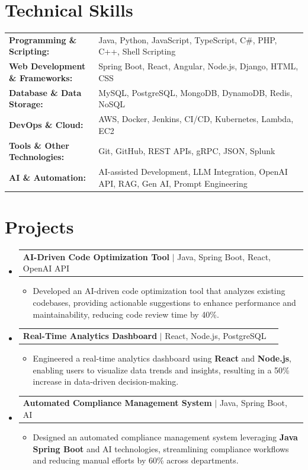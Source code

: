 \documentclass[letterpaper,10pt]{article}
\makeatletter
\newcommand{\resumeItem}[1]{
  \item{\fontsize{8pt}{9pt}\selectfont
    #1 \vspace{-3pt}
  }
}
\newcommand{\resumeProjectHeading}[2]{
    \item
    \begin{tabular*}{1.001\textwidth}{l@{\extracolsep{\fill}}r}
      \fontsize{8.5pt}{10pt}#1 & \textbf{\fontsize{8.5pt}{10pt} #2}\\
    \end{tabular*}\vspace{-7pt}
}
\newcommand{\resumeSubHeadingListStart}{\begin{itemize}[leftmargin=0pt, label={}]}
\newcommand{\resumeSubHeadingListEnd}{\end{itemize}}
\newcommand{\resumeItemListStart}{\begin{itemize}[leftmargin=*]}
\newcommand{\resumeItemListEnd}{\end{itemize}\vspace{-5pt}}
\makeatother
\begin{document}
\section{Technical Skills}
        \vspace{-14pt}
        \begin{table}[h]
            \fontsize{8pt}{9pt}\selectfont
            \begin{tabular}{p{0.3\linewidth} p{0.7\linewidth}}
                \textbf{Programming \& Scripting:} & Java, Python, JavaScript, TypeScript, C\#, PHP, C++, Shell Scripting \\
                \textbf{Web Development \& Frameworks:} & Spring Boot, React, Angular, Node.js, Django, HTML, CSS \\
                \textbf{Database \& Data Storage:} & MySQL, PostgreSQL, MongoDB, DynamoDB, Redis, NoSQL \\
                \textbf{DevOps \& Cloud:} & AWS, Docker, Jenkins, CI/CD, Kubernetes, Lambda, EC2 \\
                \textbf{Tools \& Other Technologies:} & Git, GitHub, REST APIs, gRPC, JSON, Splunk \\
                \textbf{AI \& Automation:} & AI-assisted Development, LLM Integration, OpenAI API, RAG, Gen AI, Prompt Engineering \\
            \end{tabular}
        \end{table}
 \vspace{-18pt}

\section{Projects}
    \vspace{-5pt}
    \resumeSubHeadingListStart
          \resumeProjectHeading
            {\textbf{AI-Driven Code Optimization Tool} $|$ Java, Spring Boot, React, OpenAI API}{}
            \resumeItemListStart
                \resumeItem{Developed an AI-driven code optimization tool that analyzes existing codebases, providing actionable suggestions to enhance performance and maintainability, reducing code review time by 40\%.}
            \resumeItemListEnd
        \vspace{-12pt}
    
        \resumeProjectHeading
            {\textbf{Real-Time Analytics Dashboard} $|$ React, Node.js, PostgreSQL}{}
        \resumeItemListStart
                \resumeItem{Engineered a real-time analytics dashboard using \textbf{React} and \textbf{Node.js}, enabling users to visualize data trends and insights, resulting in a 50\% increase in data-driven decision-making.}
        \resumeItemListEnd
      \vspace{-12pt}
      \resumeProjectHeading
        {\textbf{Automated Compliance Management System} $|$ Java, Spring Boot, AI}{}
    \resumeItemListStart
            \resumeItem{Designed an automated compliance management system leveraging \textbf{Java Spring Boot} and AI technologies, streamlining compliance workflows and reducing manual efforts by 60\% across departments.}
    \resumeItemListEnd
    \resumeSubHeadingListEnd
\end{document}
